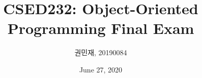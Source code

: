 \documentclass{article}
\newenvironment{answer}{
    {
        \\\textbf{Answer.}\\
    }
    {}
}
\begin{document}
    \author{권민재, 20190084}
    \title{\textbf{CSED232: Object-Oriented Programming Final Exam}}
    \date{June 27, 2020}
    \maketitle


    \begin{enumerate}[itemsep=30pt]
        \item 다음 개념들이 각각 무엇을 뜻하는지 한두줄 내외로 간략히 기술하시오.(각 4점, 총 28점)
        \begin{enumerate}[label={\Alph*.}, itemsep=15pt]
            \item Pure virtual function
            \begin{answer}
                Pure virtual function은, 보통 이것이 선언된 클래스에서 함수의 내용이 구현되지 않고, derived 클래스에서 내용을 구현해야 하는 virtual function이다.
            \end{answer}
            \item Function overloading
            \begin{answer}
                Function overloading은 함수의 이름은 같지만, 매개변수의 종류나 개수가 다른 여러 함수를 만들 수 있는 기능을 일컫는다.
                이 함수가 불릴 때, 주어진 매개변수에 대해 가장 적절한 함수가 실행되며, 적절한 함수가 하나도 없을 경우에는 실행되지 않는다.
            \end{answer}
            \item Function overriding
            \begin{answer}
                Function overriding은
            \end{answer}
            \item Dynamic binding
            \begin{answer}\end{answer}
            \item Abstract base class
            \begin{answer}\end{answer}
            \item Generic programming
            \begin{answer}\end{answer}
            \item Event-driven programming
            \begin{answer}\end{answer}

\end{enumerate}
\end{enumerate}
\end{document}
